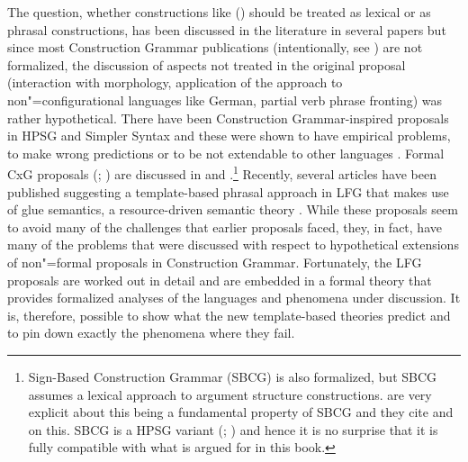 The question, whether constructions like () should be treated as lexical or as
phrasal constructions, has been discussed in the literature in several papers
\citep{GJ2004a,Mueller2006d,Goldberg2013b,MWArgSt} but since most Construction Grammar publications
(intentionally, see ) are not formalized, the discussion of aspects not treated
in the original proposal (\eg interaction with morphology, application of the approach to
non"=configurational languages like German, partial verb phrase fronting) was rather
hypothetical. There have been Construction Grammar-inspired proposals in HPSG
\citep{Haugereid2007a,Haugereid2009a} and Simpler Syntax \citep{CJ2005a} and these were shown to
have empirical problems, to make wrong predictions or to be not extendable to other languages
\citep{MuellerUnifying,MuellerGT-Eng1}. Formal CxG proposals (\citealp{BC2005a};
\citealp{vanTrijp2011a}) are discussed in  and
.\footnote{%
  Sign-Based Construction Grammar (SBCG) is also formalized, but SBCG assumes a lexical approach to
  argument structure constructions. \citet*{SBK2012a} are very explicit about this being a
  fundamental property of SBCG and they cite  and  on
  this. SBCG is a HPSG variant (\citealp[486]{Sag2010b}; \citealp[Section~10.6.2]{MuellerGT-Eng1}) and
  hence it is no surprise that it is fully compatible with what is argued for in this book.
} Recently, several articles
have been published suggesting a template-based phrasal approach in LFG that makes use of glue semantics, a resource-driven semantic
theory \citep*{Christie2010a,AGT2014a}. While these proposals seem to avoid many of the challenges
that earlier proposals faced, they, in fact, have many of the problems that were discussed with respect
to hypothetical extensions of non"=formal proposals in Construction Grammar. Fortunately, the LFG proposals are worked out in
detail and are embedded in a formal theory that provides formalized analyses of the languages and
phenomena under discussion. It is, therefore, possible to show what the new template-based theories
predict and to pin down exactly the phenomena where they fail. 

